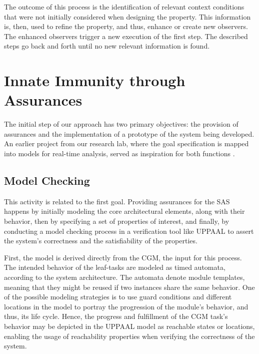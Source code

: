 The outcome of this process is the identification of relevant context conditions that were not initially considered when designing the property. This information is, then, used to refine the property, and thus, enhance or create new observers. The enhanced observers trigger a new execution of the first step. The described steps go back and forth until no new relevant information is found. 


\section{Innate Immunity through Assurances}

The initial step of our approach has two primary objectives: the provision of assurances and the implementation of a prototype of the system being developed. An earlier project from our research lab, where the goal specification is mapped into models for real-time analysis, served as inspiration for both functions \cite{seams2018}.

\subsection{Model Checking}

This activity is related to the first goal. Providing assurances for the SAS happens by initially modeling the core architectural elements, along with their behavior, then by specifying a set of properties of interest, and finally, by conducting a model checking process in a verification tool like UPPAAL \cite{UPPAAL} to assert the system's correctness and the satisfiability of the properties.

First, the model is derived directly from the CGM, the input for this process. The intended behavior of the leaf-tasks are modeled as timed automata, according to the system architecture. The automata denote module templates, meaning that they might be reused if two instances share the same behavior. One of the possible modeling strategies is to use guard conditions and different locations in the model to portray the progression of the module's behavior, and thus, its life cycle. Hence, the progress and fulfillment of the CGM task's behavior may be depicted in the UPPAAL model as reachable states or locations, enabling the usage of reachability properties when verifying the correctness of the system.

